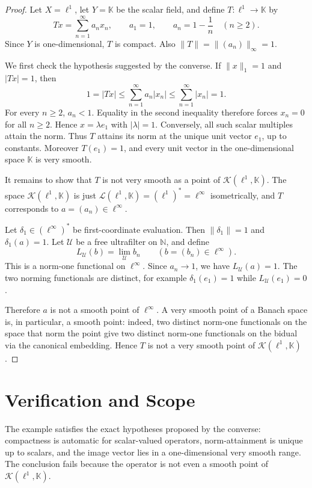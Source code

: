 \documentclass[11pt]{article}
\newcommand{\K}{\mathbb K}
\newcommand{\ellone}{\ell^1}
\newcommand{\ellinf}{\ell^\infty}
\newcommand{\calK}{\mathcal K}
\newcommand{\calU}{\mathcal U}
\begin{document}
\begin{proof}
Let \(X=\ellone\), let \(Y=\K\) be the scalar field, and define
\(T:\ellone\to\K\) by
\[
  T x = \sum_{n=1}^\infty a_n x_n,
  \qquad
  a_1=1,\qquad a_n=1-\frac1n\quad(n\ge 2).
\]
Since \(Y\) is one-dimensional, \(T\) is compact. Also
\(\|T\|=\|(a_n)\|_\infty=1\).

We first check the hypothesis suggested by the converse. If
\(\|x\|_1=1\) and \(|Tx|=1\), then
\[
  1=|Tx|
  \le \sum_{n=1}^\infty a_n |x_n|
  \le \sum_{n=1}^\infty |x_n|
  =1 .
\]
For every \(n\ge 2\), \(a_n<1\). Equality in the second inequality
therefore forces \(x_n=0\) for all \(n\ge 2\). Hence \(x=\lambda e_1\)
with \(|\lambda|=1\). Conversely, all such scalar multiples attain the
norm. Thus \(T\) attains its norm at the unique unit vector \(e_1\), up
to constants. Moreover \(T(e_1)=1\), and every unit vector in the
one-dimensional space \(\K\) is very smooth.

It remains to show that \(T\) is not very smooth as a point of
\(\calK(\ellone,\K)\). The space \(\calK(\ellone,\K)\) is just
\(\mathcal L(\ellone,\K)=(\ellone)^*=\ellinf\) isometrically, and \(T\)
corresponds to \(a=(a_n)\in\ellinf\).

Let \(\delta_1\in(\ellinf)^*\) be first-coordinate evaluation. Then
\(\|\delta_1\|=1\) and \(\delta_1(a)=1\). Let \(\calU\) be a free
ultrafilter on \(\mathbb N\), and define
\[
  L_{\calU}(b)=\lim_{\calU} b_n\qquad(b=(b_n)\in\ellinf).
\]
This is a norm-one functional on \(\ellinf\). Since \(a_n\to 1\), we have
\(L_{\calU}(a)=1\). The two norming functionals are distinct, for example
\(\delta_1(e_1)=1\) while \(L_{\calU}(e_1)=0\).

Therefore \(a\) is not a smooth point of \(\ellinf\). A very smooth point
of a Banach space is, in particular, a smooth point: indeed, two distinct
norm-one functionals on the space that norm the point give two distinct
norm-one functionals on the bidual via the canonical embedding. Hence
\(T\) is not a very smooth point of \(\calK(\ellone,\K)\).
\end{proof}

\section*{Verification and Scope}

The example satisfies the exact hypotheses proposed by the converse:
compactness is automatic for scalar-valued operators, norm-attainment is
unique up to scalars, and the image vector lies in a one-dimensional very
smooth range. The conclusion fails because the operator is not even a
smooth point of \(\calK(\ellone,\K)\).
\end{document}
